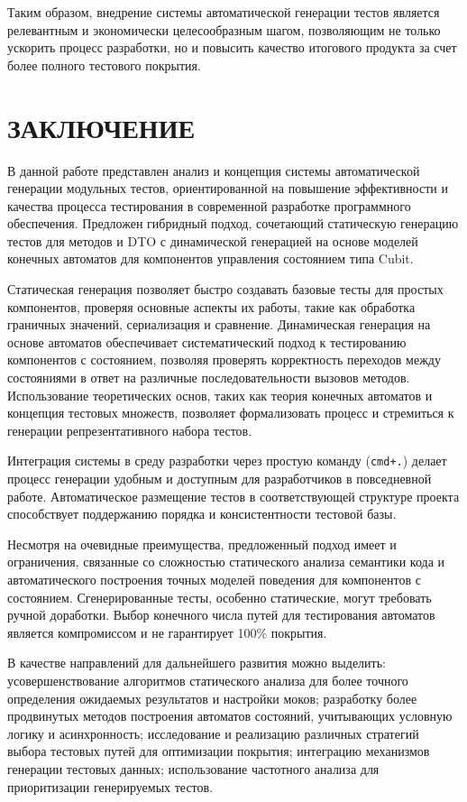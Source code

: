 \documentclass[14pt, russian]{scrartcl}
\newcommand{\anonsection}[1]{\cleardoublepage
\phantomsection
\addcontentsline{toc}{section}{\protect\numberline{}#1}
\section*{#1}\vspace*{2.5ex} %
}
\begin{document}
Таким образом, внедрение системы автоматической генерации тестов является релевантным и экономически целесообразным шагом, позволяющим не только ускорить процесс разработки, но и повысить качество итогового продукта за счет более полного тестового покрытия.

\anonsection{ЗАКЛЮЧЕНИЕ}

В данной работе представлен анализ и концепция системы автоматической генерации модульных тестов, ориентированной на повышение эффективности и качества процесса тестирования в современной разработке программного обеспечения. Предложен гибридный подход, сочетающий статическую генерацию тестов для методов и DTO с динамической генерацией на основе моделей конечных автоматов для компонентов управления состоянием типа Cubit.

Статическая генерация позволяет быстро создавать базовые тесты для простых компонентов, проверяя основные аспекты их работы, такие как обработка граничных значений, сериализация и сравнение. Динамическая генерация на основе автоматов обеспечивает систематический подход к тестированию компонентов с состоянием, позволяя проверять корректность переходов между состояниями в ответ на различные последовательности вызовов методов. Использование теоретических основ, таких как теория конечных автоматов и концепция тестовых множеств, позволяет формализовать процесс и стремиться к генерации репрезентативного набора тестов.

Интеграция системы в среду разработки через простую команду (\texttt{cmd+.}) делает процесс генерации удобным и доступным для разработчиков в повседневной работе. Автоматическое размещение тестов в соответствующей структуре проекта способствует поддержанию порядка и консистентности тестовой базы.

Несмотря на очевидные преимущества, предложенный подход имеет и ограничения, связанные со сложностью статического анализа семантики кода и автоматического построения точных моделей поведения для компонентов с состоянием. Сгенерированные тесты, особенно статические, могут требовать ручной доработки. Выбор конечного числа путей для тестирования автоматов является компромиссом и не гарантирует 100\% покрытия.

В качестве направлений для дальнейшего развития можно выделить: усовершенствование алгоритмов статического анализа для более точного определения ожидаемых результатов и настройки моков; разработку более продвинутых методов построения автоматов состояний, учитывающих условную логику и асинхронность; исследование и реализацию различных стратегий выбора тестовых путей для оптимизации покрытия; интеграцию механизмов генерации тестовых данных; использование частотного анализа для приоритизации генерируемых тестов.
\end{document}

